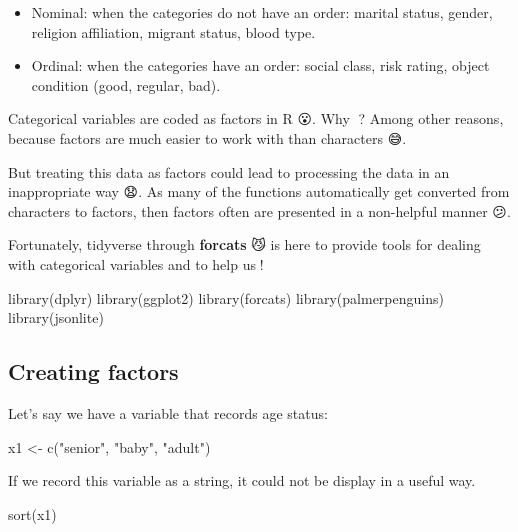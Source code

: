 \documentclass[
]{article}
\newenvironment{Shaded}{\begin{snugshade}}{\end{snugshade}}
\newcommand{\FunctionTok}[1]{\textcolor[rgb]{0.00,0.00,0.00}{#1}}
\newcommand{\NormalTok}[1]{#1}
\newcommand{\OtherTok}[1]{\textcolor[rgb]{0.56,0.35,0.01}{#1}}
\newcommand{\StringTok}[1]{\textcolor[rgb]{0.31,0.60,0.02}{#1}}
\begin{document}
\begin{itemize}
\item
  Nominal: when the categories do not have an order: marital status,
  gender, religion affiliation, migrant status, blood type.
\item
  Ordinal: when the categories have an order: social class, risk rating,
  object condition (good, regular, bad).
\end{itemize}

Categorical variables are coded as factors in R 😮. Why 🙋? Among other
reasons, because factors are much easier to work with than characters 😅.

But treating this data as factors could lead to processing the data in
an inappropriate way 😧. As many of the functions automatically get
converted from characters to factors, then factors often are presented
in a non-helpful manner 😕.

Fortunately, tidyverse through \textbf{forcats} 😼 is here to provide
tools for dealing with categorical variables and to help us💪!

\begin{Shaded}
\begin{Highlighting}[]
\FunctionTok{library}\NormalTok{(dplyr)}
\FunctionTok{library}\NormalTok{(ggplot2)}
\FunctionTok{library}\NormalTok{(forcats)}
\FunctionTok{library}\NormalTok{(palmerpenguins)}
\FunctionTok{library}\NormalTok{(jsonlite)}
\end{Highlighting}
\end{Shaded}

\hypertarget{creating-factors}{%
\subsection{Creating factors}\label{creating-factors}}

Let's say we have a variable that records age status:

\begin{Shaded}
\begin{Highlighting}[]
\NormalTok{x1 }\OtherTok{\textless{}{-}} \FunctionTok{c}\NormalTok{(}\StringTok{"senior"}\NormalTok{, }\StringTok{"baby"}\NormalTok{, }\StringTok{"adult"}\NormalTok{)}
\end{Highlighting}
\end{Shaded}

If we record this variable as a string, it could not be display in a
useful way.

\begin{Shaded}
\begin{Highlighting}[]
\FunctionTok{sort}\NormalTok{(x1)}
\end{Highlighting}
\end{Shaded}
\end{document}
